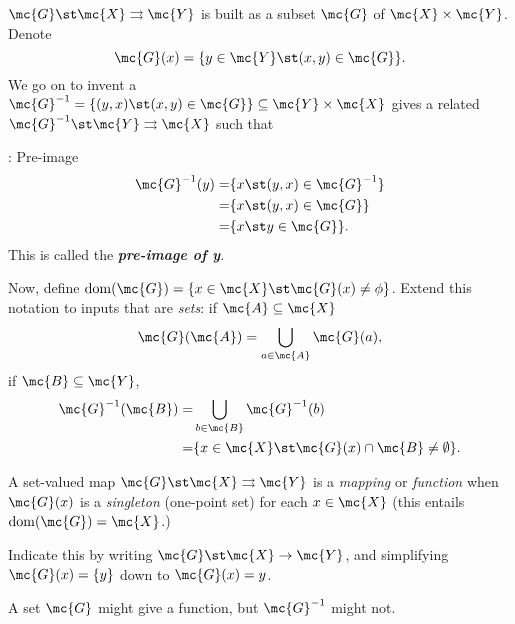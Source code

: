 \(\mc{G}\st \mc{X}\rightrightarrows \mc{Y}\) is built as a subset \(\mc{G}\) of \(\mc{X}\times \mc{Y}\). Denote 
\begin{equation*}
	\mc{G}(x)=\{y\in \mc{Y}\st (x,y)\in \mc{G}\}.
\end{equation*}
We go on to invent a \(\mc{G}^{-1}=\{(y,x)\st (x,y)\in \mc{G}\}\subseteq \mc{Y}\times \mc{X}\) gives a related \(\mc{G}^{-1}\st \mc{Y}\rightrightarrows \mc{X}\) such that 
\begin{ndef}{: Pre-image}
	\begin{align*}
		\mc{G}^{-1}(y)=&\{x\st (y,x)\in \mc{G}^{-1}\}\\
		=&\{x\st (y,x)\in \mc{G}\}\\
		=&\{x\st y\in \mc{G}\}.
	\end{align*}
	This is called the \emph{\textbf{pre-image of y}}.
\end{ndef}
Now, define \(\operatorname{dom}(\mc{G})=\{x\in \mc{X}\st \mc{G}(x)\neq \phi\}\). Extend this notation to inputs that are \emph{sets}:
\medskip
if \(\mc{A}\subseteq \mc{X}\)
\begin{equation*}
	\mc{G}(\mc{A})=\bigcup_{a\in \mc{A}}\mc{G}(a),
\end{equation*} 
if \(\mc{B}\subseteq \mc{Y}\),
\begin{align*}
	\mc{G}^{-1}(\mc{B})=&\bigcup_{b\in \mc{B}}\mc{G}^{-1}(b)\\
			 =&\{x\in \mc{X}\st \mc{G}(x)\cap \mc{B}\neq \emptyset\}.
\end{align*}

\medskip

A set-valued map \(\mc{G}\st \mc{X}\rightrightarrows \mc{Y}\) is a \emph{mapping} or \emph{function} when \(\mc{G}(x)\) is a \emph{singleton} (one-point set) for each \(x\in \mc{X}\) (this entails \(\operatorname{dom}(\mc{G})=\mc{X}\).) 

\begin{notation}
	Indicate  this by writing \(\mc{G}\st \mc{X}\to \mc{Y}\), and simplifying \(\mc{G}(x)=\{y\}\) down to \(\mc{G}(x)=y\).
\end{notation}

\begin{note}
	A set \(\mc{G}\) might give a function, but \(\mc{G}^{-1}\) might not.
\end{note}

